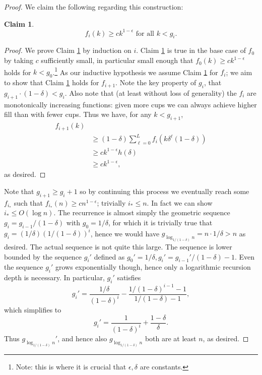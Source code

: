 \documentclass[twocolumn]{article}[10pt]
\newtheorem{clm}{Claim}
\begin{document}
\begin{proof}
  We claim the following regarding this construction:
  \begin{clm}
    \label{clm:fikinduction}
  \begin{equation}
    f_i(k) \ge ck^{1-\epsilon} \text{ for all } k < g_i. 
  \end{equation}
  \end{clm}
  \begin{proof}
  We prove Claim \ref{clm:fikinduction} by induction on $i$.
  Claim \ref{clm:fikinduction} is true in the base case of $f_0$ by taking $c$
  sufficiently small, in particular small enough that $f_0(k) \ge
  ck^{1-\epsilon}$ holds for $k < g_0$.\footnote{Note: this is where it is
    crucial that $\epsilon, \delta$ are constants.}
  As our inductive hypothesis we assume Claim \ref{clm:fikinduction} for $f_i$;
  we aim to show that Claim \ref{clm:fikinduction} holds for $f_{i+1}$. Note
  the key property of $g_i$, that $g_{i+1}\cdot(1-\delta) < g_i$. Also note
  that (at least without loss of generality) the $f_i$ are monotonically increasing
  functions: given more cups we can always achieve higher fill than with fewer
  cups. Thus we have, for any $k<g_{i+1}$,
  \begin{align*}
    f_{i+1}(k) &\\
    &\ge (1-\delta)\sum_{\ell=0}^L f_i(k\delta^\ell(1-\delta))\\
    &\ge ck^{1-\epsilon}h(\delta)\\
    &\ge ck^{1-\epsilon},
  \end{align*}
  as desired. 
  \end{proof}

  Note that $g_{i+1} \ge g_i + 1$ so by continuing this process we eventually
  reach some $f_{i_*}$ such that $f_{i_*}(n) \ge cn^{1-\epsilon}$; trivially
  $i_* \le n$. In fact we can show $i_* \le O(\log n)$. The recurrence is
  almost simply the geometric sequence $g_i = g_{i-1}/(1-\delta)$ with
  $g_0=1/\delta$, for which it is trivially true that $g_i =
  (1/\delta) (1/(1-\delta))^i$, hence we would have
  $g_{\log_{1/(1-\delta)} n} = n\cdot 1/\delta > n$ as
  desired. The actual sequence is not quite this large. The sequence is lower
  bounded by the sequence $g_i'$ defined as $g_0'=1/\delta, g_i' = g_{i-1}' /
  (1-\delta) -1$. Even the sequence $g_i'$ grows exponentially though, hence
  only a logarithmic recursion depth is necessary. In particular, $g_i'$ satisfies
  $$g_i' = \frac{1/\delta}{(1-\delta)^i} - \frac{1/(1-\delta)^{i-1}-1}{1/(1-\delta)-1},$$
  which simplifies to
  $$g_i' = \frac{1}{(1-\delta)^i} + \frac{1-\delta}{\delta}.$$
  Thus $g_{\log_{1/(1-\delta)} n}'$, and hence also $g_{\log_{1/(1-\delta)} n}$
  both are at least $n$, as desired.


\end{proof}
\end{document}
